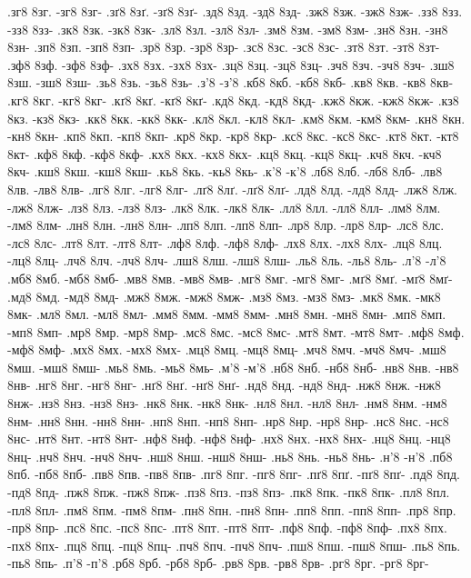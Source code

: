 {.зг8 8зг. -зг8 8зг-
.зґ8 8зґ. -зґ8 8зґ-
.зд8 8зд. -зд8 8зд-
.зж8 8зж. -зж8 8зж-
.зз8 8зз. -зз8 8зз-
.зк8 8зк. -зк8 8зк-
.зл8 8зл. -зл8 8зл-
.зм8 8зм. -зм8 8зм-
.зн8 8зн. -зн8 8зн-
.зп8 8зп. -зп8 8зп-
.зр8 8зр. -зр8 8зр-
.зс8 8зс. -зс8 8зс-
.зт8 8зт. -зт8 8зт-
.зф8 8зф. -зф8 8зф-
.зх8 8зх. -зх8 8зх-
.зц8 8зц. -зц8 8зц-
.зч8 8зч. -зч8 8зч-
.зш8 8зш. -зш8 8зш-
.зь8 8зь. -зь8 8зь-
.з'8 -з'8
.кб8 8кб. -кб8 8кб-
.кв8 8кв. -кв8 8кв-
.кг8 8кг. -кг8 8кг-
.кґ8 8кґ. -кґ8 8кґ-
.кд8 8кд. -кд8 8кд-
.кж8 8кж. -кж8 8кж-
.кз8 8кз. -кз8 8кз-
.кк8 8кк. -кк8 8кк-
.кл8 8кл. -кл8 8кл-
.км8 8км. -км8 8км-
.кн8 8кн. -кн8 8кн-
.кп8 8кп. -кп8 8кп-
.кр8 8кр. -кр8 8кр-
.кс8 8кс. -кс8 8кс-
.кт8 8кт. -кт8 8кт-
.кф8 8кф. -кф8 8кф-
.кх8 8кх. -кх8 8кх-
.кц8 8кц. -кц8 8кц-
.кч8 8кч. -кч8 8кч-
.кш8 8кш. -кш8 8кш-
.кь8 8кь. -кь8 8кь-
.к'8 -к'8
.лб8 8лб. -лб8 8лб-
.лв8 8лв. -лв8 8лв-
.лг8 8лг. -лг8 8лг-
.лґ8 8лґ. -лґ8 8лґ-
.лд8 8лд. -лд8 8лд-
.лж8 8лж. -лж8 8лж-
.лз8 8лз. -лз8 8лз-
.лк8 8лк. -лк8 8лк-
.лл8 8лл. -лл8 8лл-
.лм8 8лм. -лм8 8лм-
.лн8 8лн. -лн8 8лн-
.лп8 8лп. -лп8 8лп-
.лр8 8лр. -лр8 8лр-
.лс8 8лс. -лс8 8лс-
.лт8 8лт. -лт8 8лт-
.лф8 8лф. -лф8 8лф-
.лх8 8лх. -лх8 8лх-
.лц8 8лц. -лц8 8лц-
.лч8 8лч. -лч8 8лч-
.лш8 8лш. -лш8 8лш-
.ль8 8ль. -ль8 8ль-
.л'8 -л'8
.мб8 8мб. -мб8 8мб-
.мв8 8мв. -мв8 8мв-
.мг8 8мг. -мг8 8мг-
.мґ8 8мґ. -мґ8 8мґ-
.мд8 8мд. -мд8 8мд-
.мж8 8мж. -мж8 8мж-
.мз8 8мз. -мз8 8мз-
.мк8 8мк. -мк8 8мк-
.мл8 8мл. -мл8 8мл-
.мм8 8мм. -мм8 8мм-
.мн8 8мн. -мн8 8мн-
.мп8 8мп. -мп8 8мп-
.мр8 8мр. -мр8 8мр-
.мс8 8мс. -мс8 8мс-
.мт8 8мт. -мт8 8мт-
.мф8 8мф. -мф8 8мф-
.мх8 8мх. -мх8 8мх-
.мц8 8мц. -мц8 8мц-
.мч8 8мч. -мч8 8мч-
.мш8 8мш. -мш8 8мш-
.мь8 8мь. -мь8 8мь-
.м'8 -м'8
.нб8 8нб. -нб8 8нб-
.нв8 8нв. -нв8 8нв-
.нг8 8нг. -нг8 8нг-
.нґ8 8нґ. -нґ8 8нґ-
.нд8 8нд. -нд8 8нд-
.нж8 8нж. -нж8 8нж-
.нз8 8нз. -нз8 8нз-
.нк8 8нк. -нк8 8нк-
.нл8 8нл. -нл8 8нл-
.нм8 8нм. -нм8 8нм-
.нн8 8нн. -нн8 8нн-
.нп8 8нп. -нп8 8нп-
.нр8 8нр. -нр8 8нр-
.нс8 8нс. -нс8 8нс-
.нт8 8нт. -нт8 8нт-
.нф8 8нф. -нф8 8нф-
.нх8 8нх. -нх8 8нх-
.нц8 8нц. -нц8 8нц-
.нч8 8нч. -нч8 8нч-
.нш8 8нш. -нш8 8нш-
.нь8 8нь. -нь8 8нь-
.н'8 -н'8
.пб8 8пб. -пб8 8пб-
.пв8 8пв. -пв8 8пв-
.пг8 8пг. -пг8 8пг-
.пґ8 8пґ. -пґ8 8пґ-
.пд8 8пд. -пд8 8пд-
.пж8 8пж. -пж8 8пж-
.пз8 8пз. -пз8 8пз-
.пк8 8пк. -пк8 8пк-
.пл8 8пл. -пл8 8пл-
.пм8 8пм. -пм8 8пм-
.пн8 8пн. -пн8 8пн-
.пп8 8пп. -пп8 8пп-
.пр8 8пр. -пр8 8пр-
.пс8 8пс. -пс8 8пс-
.пт8 8пт. -пт8 8пт-
.пф8 8пф. -пф8 8пф-
.пх8 8пх. -пх8 8пх-
.пц8 8пц. -пц8 8пц-
.пч8 8пч. -пч8 8пч-
.пш8 8пш. -пш8 8пш-
.пь8 8пь. -пь8 8пь-
.п'8 -п'8
.рб8 8рб. -рб8 8рб-
.рв8 8рв. -рв8 8рв-
.рг8 8рг. -рг8 8рг-
}
